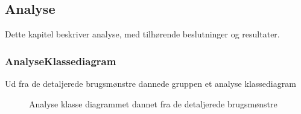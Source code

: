 \hfuzz=100pt
\vfuzz=100pt
\subsection{Analyse}

Dette kapitel beskriver analyse, med tilhørende beslutninger og resultater.

\subsubsection{AnalyseKlassediagram} Ud fra de detaljerede brugsmønstre dannede gruppen et analyse klassediagram

\begin{figure}[H]
    \caption{Analyse klasse diagrammet dannet fra de detaljerede brugsmønstre}
    \label{fig:AnalyseKlasseDiagram}
\end{figure}

